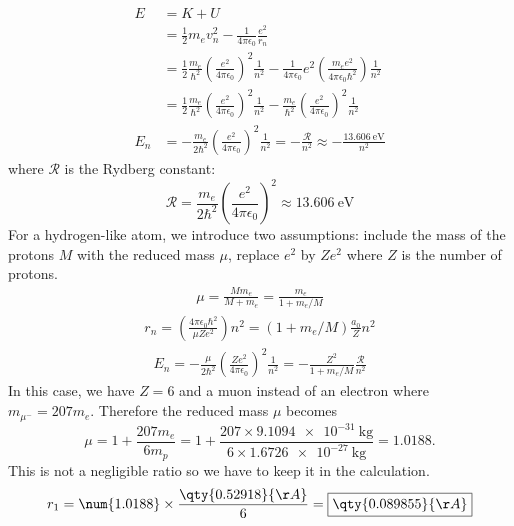 \documentclass{article}
\numberwithin{equation}{section}
\begin{document}
\begin{enumerate}
        \begin{align}
            E &= K + U \\
              &= \frac{1}{2} m_e v_n^2 - \frac{1}{4\pi \epsilon_0} \frac{e^2}{r_n} \\
              &= \frac{1}{2} \frac{m_e}{\hbar^2} \left(  \frac{e^2}{4\pi\epsilon_0} \right)^2 \frac{1}{n^2} - \frac{1}{4\pi \epsilon_0} e^2 \left( \frac{m_e e^2}{4\pi\epsilon_0 \hbar^2} \right) \frac{1}{n^2} \\
              &= \frac{1}{2} \frac{m_e}{\hbar^2} \left(  \frac{e^2}{4\pi\epsilon_0} \right)^2 \frac{1}{n^2} - \frac{m_e}{\hbar^2} \left(  \frac{e^2}{4\pi\epsilon_0} \right)^2 \frac{1}{n^2} \\
          E_n &= - \frac{m_e}{2\hbar^2} \left(  \frac{e^2}{4\pi\epsilon_0} \right)^2 \frac{1}{n^2} = -\frac{\mathcal{R}}{n^2} \approx -\frac{\qty{13.606}{\electronvolt}}{n^2}
        \end{align}
        where $\mathcal{R}$ is the Rydberg constant:
        \begin{equation}
            \mathcal{R} = \frac{m_e}{2\hbar^2} \left(  \frac{e^2}{4\pi\epsilon_0} \right)^2 \approx \qty{13.606}{\electronvolt}
        \end{equation}
        For a hydrogen-like atom, we introduce two assumptions: include the mass of the protons $M$ with the reduced mass $\mu$, replace $e^2$ by $Ze^2$ where $Z$ is the number of protons.
        \begin{align}
            \mu = \frac{M m_e}{M + m_e} = \frac{m_e}{1 + m_e/M}
        \end{align}
        \begin{align}
            r_n = \left( \frac{4\pi\epsilon_0 \hbar^2}{\mu Ze^2} \right) n^2 = \left( 1 + m_e/M \right) \frac{a_0}{Z}n^2
        \end{align}
        \begin{align}
            E_n = - \frac{\mu}{2\hbar^2} \left(  \frac{Ze^2}{4\pi\epsilon_0} \right)^2 \frac{1}{n^2} = - \frac{Z^2}{1 + m_e/M} \frac{\mathcal{R}}{n^2}
        \end{align}
        In this case, we have $Z=6$ and a muon instead of an electron where $m_{\mu^-} = 207m_e$. Therefore the reduced mass $\mu$ becomes
        \begin{equation}
            \mu = 1 + \frac{207 m_e}{6 m_p} = 1 + \frac{207 \times \qty{9.1094e-31}{\kilogram}}{6 \times \qty{1.6726e-27}{\kilogram}} = \num{1.0188}.
        \end{equation}
        This is not a negligible ratio so we have to keep it in the calculation.
        \begin{align}
            r_1 = \num{1.0188} \times \frac{\qty{0.52918}{\AA}}{6} = \boxed{\qty{0.089855}{\AA}}
        \end{align}
        

\end{enumerate}
\end{document}
